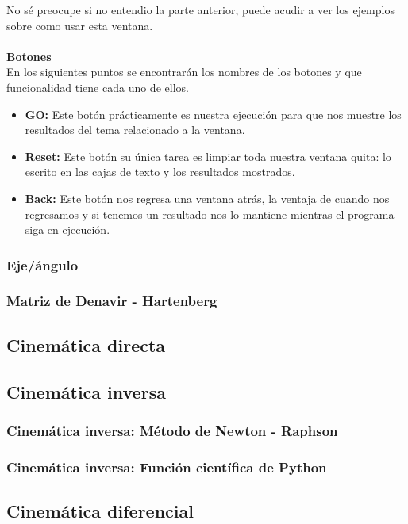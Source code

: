 \documentclass[12pt]{article}
\begin{document}
No sé preocupe si no entendio la parte anterior, puede acudir a ver los ejemplos sobre como usar esta ventana.\\
\\
\textbf{Botones}\\
En los siguientes puntos se encontrarán los nombres de los botones y que funcionalidad tiene cada uno de ellos.
\begin{itemize}
	\item \textbf{GO:} Este botón prácticamente es nuestra ejecución para que nos muestre los resultados del tema relacionado a la ventana.
	\item \textbf{Reset:} Este botón su única tarea es limpiar toda nuestra ventana quita: lo escrito en las cajas de texto y los resultados mostrados.
	\item \textbf{Back:} Este botón nos regresa una ventana atrás, la ventaja de cuando nos regresamos y si tenemos un resultado nos lo mantiene mientras el programa siga en ejecución.
\end{itemize}
\subsubsection{Eje/ángulo}
\subsubsection{Matriz de Denavir - Hartenberg}
\subsection{Cinemática directa}
\subsection{Cinemática inversa}
\subsubsection{Cinemática inversa: Método de Newton - Raphson}
\subsubsection{Cinemática inversa: Función científica de Python}
\subsection{Cinemática diferencial}
\end{document}
